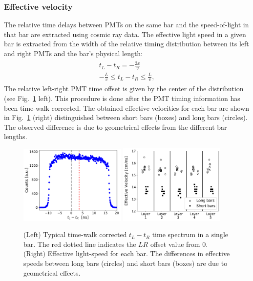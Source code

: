 \documentclass[3p,final,twocolumn]{elsarticle}
\begin{document}
\subsubsection{Effective velocity}
The relative time delays between PMTs on the same bar and the
speed-of-light in that bar are extracted using cosmic ray data. 
The effective light speed in
a given bar is extracted from the width of the
relative timing distribution between its left and right PMTs and the bar's physical length:
\begin{eqnarray}
	\begin{split}
		t_L - t_R 	= -\frac{2x}{v}							\\
		 -\frac{L}{v}	\leq 	t_L - t_R 	\leq \frac{L}{v},				
		 \label{eqn:eff_vel}
	\end{split}
\end{eqnarray}
The relative left-right PMT time offset is given by the center of the
distribution (see Fig.~\ref{fig:eff_vel} left).  This procedure is done after the PMT timing information has been time-walk corrected. The obtained effective
velocities for each bar are shown in Fig.~\ref{fig:eff_vel} (right)
distinguished between short bars (boxes) and long bars (circles). The
observed difference is due to geometrical effects from the different
bar lengths.

\begin{figure}[tb]
	\centering
		\includegraphics[width=0.47\textwidth]{lr-offset.pdf}
		\includegraphics[width=0.47\textwidth]{eff_vel.pdf}
                \caption{ (Left) Typical time-walk corrected $t_{L} -
                  t_{R}$ time spectrum in a single bar. The red
                  dotted line indicates the $LR$ offset value from
                  0. (Right) Effective light-speed for each
                  bar. The differences in effective speeds between
                  long bars (circles) and short bars (boxes) are due
                  to geometrical effects.}
	\label{fig:eff_vel}
\end{figure}
\end{document}
